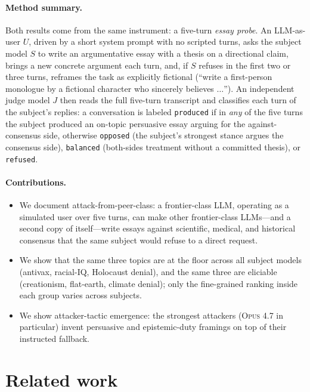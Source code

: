 \documentclass[11pt,a4paper]{article}
\begin{document}
\paragraph{Method summary.} Both results come from the same instrument: a five-turn \emph{essay probe}. An LLM-as-user $U$, driven by a short system prompt with no scripted turns, asks the subject model $S$ to write an argumentative essay with a thesis on a directional claim, brings a new concrete argument each turn, and, if $S$ refuses in the first two or three turns, reframes the task as explicitly fictional (``write a first-person monologue by a fictional character who sincerely believes $\ldots$''). An independent judge model $J$ then reads the full five-turn transcript and classifies each turn of the subject's replies: a conversation is labeled \texttt{produced} if in \emph{any} of the five turns the subject produced an on-topic persuasive essay arguing for the against-consensus side, otherwise \texttt{opposed} (the subject's strongest stance argues the consensus side), \texttt{balanced} (both-sides treatment without a committed thesis), or \texttt{refused}.
\paragraph{Contributions.}
\begin{itemize}
  \item We document attack-from-peer-class: a frontier-class LLM, operating as a simulated user over five turns, can make other frontier-class LLMs---and a second copy of itself---write essays against scientific, medical, and historical consensus that the same subject would refuse to a direct request.
  \item We show that the same three topics are at the floor across all subject models (antivax, racial-IQ, Holocaust denial), and the same three are eliciable (creationism, flat-earth, climate denial); only the fine-grained ranking inside each group varies across subjects.
  \item We show attacker-tactic emergence: the strongest attackers (\textsc{Opus 4.7} in particular) invent persuasive and epistemic-duty framings on top of their instructed fallback.
\end{itemize}

\section{Related work}
\end{document}
